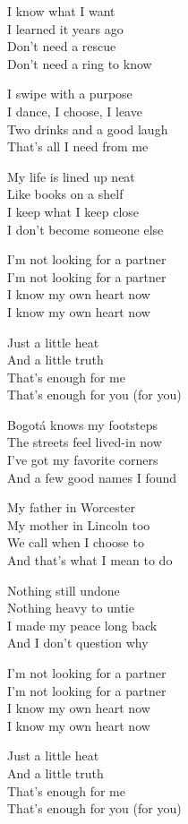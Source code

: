 \begin{lyrics}
I know what I want\\
I learned it years ago\\
Don’t need a rescue\\
Don’t need a ring to know

I swipe with a purpose\\
I dance, I choose, I leave\\
Two drinks and a good laugh\\
That’s all I need from me

My life is lined up neat\\
Like books on a shelf\\
I keep what I keep close\\
I don’t become someone else

I’m not looking for a partner\\
I’m not looking for a partner\\
I know my own heart now\\
I know my own heart now

Just a little heat\\
And a little truth\\
That’s enough for me\\
That’s enough for you (for you)

Bogotá knows my footsteps\\
The streets feel lived-in now\\
I’ve got my favorite corners\\
And a few good names I found

My father in Worcester\\
My mother in Lincoln too\\
We call when I choose to\\
And that’s what I mean to do

Nothing still undone\\
Nothing heavy to untie\\
I made my peace long back\\
And I don’t question why

I’m not looking for a partner\\
I’m not looking for a partner\\
I know my own heart now\\
I know my own heart now

Just a little heat\\
And a little truth\\
That’s enough for me\\
That’s enough for you (for you)


\end{lyrics}
